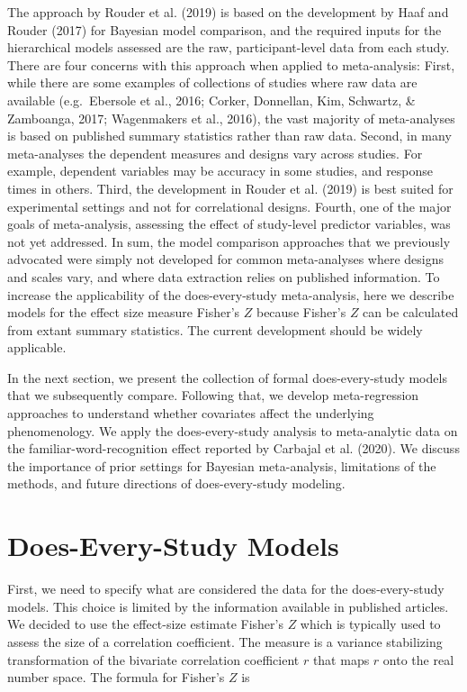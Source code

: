 \documentclass[english,,man]{apa6}
\begin{document}
The approach by Rouder et al. (2019) is based on the development by Haaf and Rouder (2017) for Bayesian model comparison, and the required inputs for the hierarchical models assessed are the raw, participant-level data from each study. There are four concerns with this approach when applied to meta-analysis: First, while there are some examples of collections of studies where raw data are available (e.g.~Ebersole et al., 2016; Corker, Donnellan, Kim, Schwartz, \& Zamboanga, 2017; Wagenmakers et al., 2016), the vast majority of meta-analyses is based on published summary statistics rather than raw data. Second, in many meta-analyses the dependent measures and designs vary across studies. For example, dependent variables may be accuracy in some studies, and response times in others. Third, the development in Rouder et al. (2019) is best suited for experimental settings and not for correlational designs. Fourth, one of the major goals of meta-analysis, assessing the effect of study-level predictor variables, was not yet addressed. In sum, the model comparison approaches that we previously advocated were simply not developed for common meta-analyses where designs and scales vary, and where data extraction relies on published information. To increase the applicability of the does-every-study meta-analysis, here we describe models for the effect size measure Fisher's \(Z\) because Fisher's \(Z\) can be calculated from extant summary statistics. The current development should be widely applicable.

In the next section, we present the collection of formal does-every-study models that we subsequently compare. Following that, we develop meta-regression approaches to understand whether covariates affect the underlying phenomenology. We apply the does-every-study analysis to meta-analytic data on the familiar-word-recognition effect reported by Carbajal et al. (2020). We discuss the importance of prior settings for Bayesian meta-analysis, limitations of the methods, and future directions of does-every-study modeling.

\hypertarget{does-every-study-models}{%
\section{Does-Every-Study Models}\label{does-every-study-models}}

First, we need to specify what are considered the data for the does-every-study models. This choice is limited by the information available in published articles. We decided to use the effect-size estimate Fisher's \(Z\) which is typically used to assess the size of a correlation coefficient. The measure is a variance stabilizing transformation of the bivariate correlation coefficient \(r\) that maps \(r\) onto the real number space. The formula for Fisher's \(Z\) is
\end{document}

